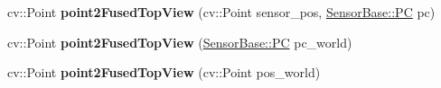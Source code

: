 \begin{DoxyCompactItemize}
\item 
\hypertarget{class_sensor_info_ad1ca7e43a1110587b3bd5dfc2e456e04}{}cv\+::\+Point {\bfseries point2\+Fused\+Top\+View} (cv\+::\+Point sensor\+\_\+pos, \hyperlink{struct_sensor_base_1_1_p_c}{Sensor\+Base\+::\+P\+C} pc)\label{class_sensor_info_ad1ca7e43a1110587b3bd5dfc2e456e04}

\item 
\hypertarget{class_sensor_info_a3eaa24b9ef5c65b3ec657650c033239d}{}cv\+::\+Point {\bfseries point2\+Fused\+Top\+View} (\hyperlink{struct_sensor_base_1_1_p_c}{Sensor\+Base\+::\+P\+C} pc\+\_\+world)\label{class_sensor_info_a3eaa24b9ef5c65b3ec657650c033239d}

\item 
\hypertarget{class_sensor_info_ac8151e69e77059719163ddd0147df7c5}{}cv\+::\+Point {\bfseries point2\+Fused\+Top\+View} (cv\+::\+Point pos\+\_\+world)\label{class_sensor_info_ac8151e69e77059719163ddd0147df7c5}

\end{DoxyCompactItemize}
